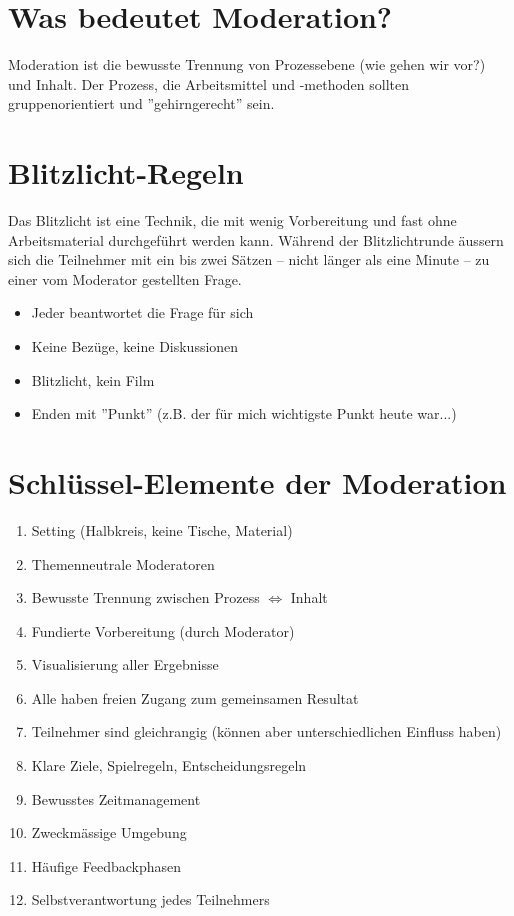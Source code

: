 \section{Was bedeutet Moderation?}

Moderation ist die bewusste Trennung von Prozessebene (wie gehen wir vor?) und Inhalt. Der Prozess, die Arbeitsmittel und -methoden sollten gruppenorientiert und ''gehirngerecht'' sein.

\section{Blitzlicht-Regeln}

Das Blitzlicht ist eine Technik, die mit wenig Vorbereitung und fast ohne Arbeitsmaterial durchgeführt werden kann. Während der Blitzlichtrunde äussern sich die Teilnehmer mit ein bis zwei Sätzen – nicht länger als eine Minute – zu einer vom Moderator gestellten Frage.

\begin{itemize}
	\item Jeder beantwortet die Frage für sich
	\item Keine Bezüge, keine Diskussionen
	\item Blitzlicht, kein Film
	\item Enden mit ''Punkt'' (z.B. der für mich wichtigste Punkt heute war...)
\end{itemize}

\section{Schlüssel-Elemente der Moderation}

\begin{enumerate}
	\item Setting (Halbkreis, keine Tische, Material)
	\item Themenneutrale Moderatoren
	\item Bewusste Trennung zwischen Prozess $\Longleftrightarrow$ Inhalt
	\item Fundierte Vorbereitung (durch Moderator)
	\item Visualisierung aller Ergebnisse
	\item Alle haben freien Zugang zum gemeinsamen Resultat
	\item Teilnehmer sind gleichrangig (können aber unterschiedlichen Einfluss haben)
	\item Klare Ziele, Spielregeln, Entscheidungsregeln
	\item Bewusstes Zeitmanagement
	\item Zweckmässige Umgebung
	\item Häufige Feedbackphasen
	\item Selbstverantwortung jedes Teilnehmers
\end{enumerate}